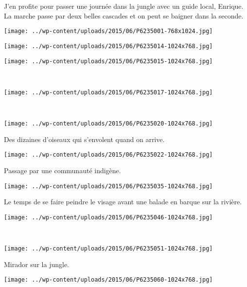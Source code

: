 J'en profite pour passer une journée dans la jungle avec un guide local, Enrique. La marche passe par deux belles cascades et on peut se baigner dans la seconde. 
\begin{center} 
\texttt{[image: ../wp-content/uploads/2015/06/P6235001-768x1024.jpg]} \end{center}
\begin{center} 
\texttt{[image: ../wp-content/uploads/2015/06/P6235014-1024x768.jpg]} 
\end{center} 
\vfill
\begin{center} 
\texttt{[image: ../wp-content/uploads/2015/06/P6235015-1024x768.jpg]} 
\end{center}
\vspace{-\topsep}
\vspace{-0.75mm}
\pagebreak
~
\begin{center} 
\texttt{[image: ../wp-content/uploads/2015/06/P6235017-1024x768.jpg]} 
\end{center}
~
\begin{center} 
\texttt{[image: ../wp-content/uploads/2015/06/P6235020-1024x768.jpg]} 
\end{center}
\vspace{-\topsep}
\pagebreak

Des dizaines d'oiseaux qui s'envolent quand on arrive. 
\begin{center} 
\texttt{[image: ../wp-content/uploads/2015/06/P6235022-1024x768.jpg]} 
\end{center}

Passage par une communauté indigène. 
\begin{center} 
\texttt{[image: ../wp-content/uploads/2015/06/P6235035-1024x768.jpg]} 
\end{center}
\vspace{-\topsep}
\pagebreak

Le temps de se faire peindre le visage avant une balade en barque sur la rivière. 
\begin{center} 
\texttt{[image: ../wp-content/uploads/2015/06/P6235046-1024x768.jpg]} 
\end{center}
~
\begin{center} 
\texttt{[image: ../wp-content/uploads/2015/06/P6235051-1024x768.jpg]} 
\end{center}
\vspace{-\topsep}
\pagebreak
Mirador sur la jungle. \\
\begin{center} 
\texttt{[image: ../wp-content/uploads/2015/06/P6235060-1024x768.jpg]} 
\end{center}

